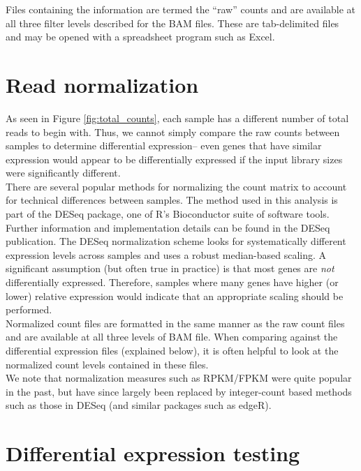 \documentclass{article}
\begin{document}
{{Files containing the information are termed the ``raw'' counts and are available at all three filter levels described for the BAM files.  These are tab-delimited files and may be opened with a spreadsheet program such as Excel.


\section{Read normalization}
\label{sec:normalization}

As seen in Figure \ref{fig:total_counts}, each sample has a different number of total reads to begin with.  Thus, we cannot simply compare the raw counts between samples to determine differential expression-- even genes that have similar expression would appear to be differentially expressed if the input library sizes were significantly different.\\

There are several popular methods for normalizing the count matrix to account for technical differences between samples.  The method used in this analysis is part of the DESeq \cite{deseq} package, one of R's Bioconductor suite of software tools.  Further information and implementation details can be found in the DESeq publication.  The DESeq normalization scheme looks for systematically different expression levels across samples and uses a robust median-based scaling.  A significant assumption (but often true in practice) is that most genes are \emph{not} differentially expressed.  Therefore, samples where many genes have higher (or lower) relative expression would indicate that an appropriate scaling should be performed.   \\

Normalized count files are formatted in the same manner as the raw count files and are available at all three levels of BAM file.  When comparing against the differential expression files (explained below), it is often helpful to look at the normalized count levels contained in these files.\\

We note that normalization measures such as RPKM/FPKM were quite popular in the past, but have since largely been replaced by integer-count based methods such as those in DESeq (and similar packages such as edgeR).


{%

\section{Differential expression testing}

}}}
\end{document}
